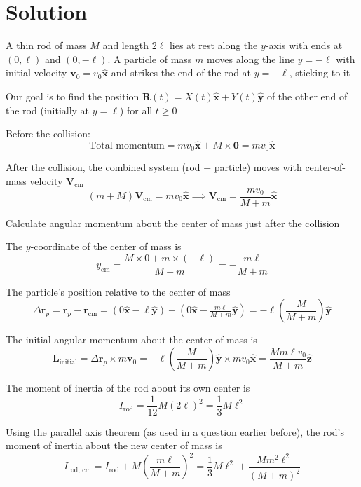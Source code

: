 \documentclass[12pt]{article}
\begin{document}
\section*{Solution}


A thin rod of mass $M$ and length $2\ell$ lies at rest along the $y$-axis with ends at $(0, \ell)$ and $(0, -\ell)$. A particle of mass $m$ moves along the line $y = -\ell$ with initial velocity $\mathbf{v}_0 = v_0 \hat{\mathbf{x}}$ and strikes the end of the rod at $y = -\ell$, sticking to it

Our goal is to find the position $\mathbf{R}(t) = X(t)\hat{\mathbf{x}} + Y(t)\hat{\mathbf{y}}$ of the other end of the rod (initially at $y = \ell$) for all $t \geq 0$


Before the collision:
\[
\text{Total momentum} = m v_0 \hat{\mathbf{x}} + M \times \mathbf{0} = m v_0 \hat{\mathbf{x}}
\]

After the collision, the combined system (rod + particle) moves with center-of-mass velocity $\mathbf{V}_{\text{cm}}$
\[
(m + M)\mathbf{V}_{\text{cm}} = m v_0 \hat{\mathbf{x}} \implies \mathbf{V}_{\text{cm}} = \frac{m v_0}{M + m} \hat{\mathbf{x}}
\]

Calculate angular momentum about the center of mass just after the collision


The $y$-coordinate of the center of mass is
\[
y_{\text{cm}} = \frac{M \times 0 + m \times (-\ell)}{M + m} = -\frac{m \ell}{M + m}
\]


The particle's position relative to the center of mass
\[
\Delta \mathbf{r}_p = \mathbf{r}_p - \mathbf{r}_{\text{cm}} = (0 \hat{\mathbf{x}} - \ell \hat{\mathbf{y}}) - (0 \hat{\mathbf{x}} - \tfrac{m \ell}{M + m} \hat{\mathbf{y}}) = -\ell \left( \frac{M}{M + m} \right) \hat{\mathbf{y}}
\]

The initial angular momentum about the center of mass is
\[
\mathbf{L}_{\text{initial}} = \Delta \mathbf{r}_p \times m \mathbf{v}_0 = -\ell \left( \frac{M}{M + m} \right) \hat{\mathbf{y}} \times m v_0 \hat{\mathbf{x}} = \frac{M m \ell v_0}{M + m} \hat{\mathbf{z}}
\]

The moment of inertia of the rod about its own center is
\[
I_{\text{rod}} = \frac{1}{12} M (2\ell)^2 = \frac{1}{3} M \ell^2
\]

Using the parallel axis theorem (as used in a question earlier before), the rod's moment of inertia about the new center of mass is
\[
I_{\text{rod, cm}} = I_{\text{rod}} + M \left( \frac{m \ell}{M + m} \right)^2 = \frac{1}{3} M \ell^2 + \frac{M m^2 \ell^2}{(M + m)^2}
\]
\end{document}
